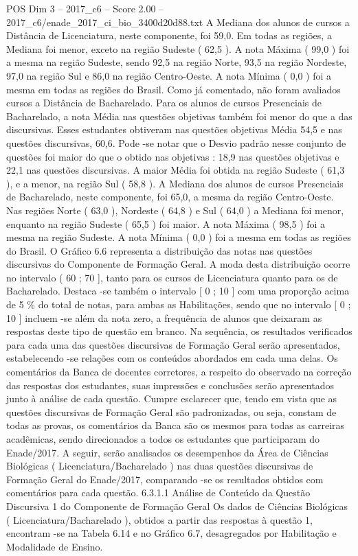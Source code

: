 \begin{textsample}{POS Dim 3 – 2017\_c6 – Score 2.00 – 2017\_c6/enade\_2017\_ci\_bio\_3400d20d88.txt}
A Mediana dos alunos de cursos a Distância de Licenciatura, neste componente, foi 59,0.
Em todas as regiões, a Mediana foi menor, exceto na região Sudeste ( 62,5 ).
A nota Máxima ( 99,0 ) foi a mesma na região Sudeste, sendo 92,5 na região Norte, 93,5 na região Nordeste, 97,0 na região Sul e 86,0 na região Centro-Oeste.
A nota Mínima ( 0,0 ) foi a mesma em todas as regiões do Brasil.
Como já comentado, não foram avaliados cursos a Distância de Bacharelado.
Para os alunos de cursos Presenciais de Bacharelado, a nota Média nas questões objetivas também foi menor do que a das discursivas.
Esses estudantes obtiveram nas questões objetivas Média 54,5 e nas questões discursivas, 60,6.
Pode -se notar que o Desvio padrão nesse conjunto de questões foi maior do que o obtido nas objetivas : 18,9 nas questões objetivas e 22,1 nas questões discursivas.
A maior Média foi obtida na região Sudeste ( 61,3 ), e a menor, na região Sul ( 58,8 ).
A Mediana dos alunos de cursos Presenciais de Bacharelado, neste componente, foi 65,0, a mesma da região Centro-Oeste.
Nas regiões Norte ( 63,0 ), Nordeste ( 64,8 ) e Sul ( 64,0 ) a Mediana foi menor, enquanto na região Sudeste ( 65,5 ) foi maior.
A nota Máxima ( 98,5 ) foi a mesma na região Sudeste.
A nota Mínima ( 0,0 ) foi a mesma em todas as regiões do Brasil.
O Gráfico 6.6 representa a distribuição das notas nas questões discursivas do Componente de Formação Geral.
A moda desta distribuição ocorre no intervalo ( 60 ; 70 ], tanto para os cursos de Licenciatura quanto para os de Bacharelado.
Destaca -se também o intervalo [ 0 ; 10 ] com uma proporção acima de 5 \% do total de notas, para ambas as Habilitações, sendo que no intervalo [ 0 ; 10 ] incluem -se além da nota zero, a frequência de alunos que deixaram as respostas deste tipo de questão em branco.
Na sequência, os resultados verificados para cada uma das questões discursivas de Formação Geral serão apresentados, estabelecendo -se relações com os conteúdos abordados em cada uma delas.
Os comentários da Banca de docentes corretores, a respeito do observado na correção das respostas dos estudantes, suas impressões e conclusões serão apresentados junto à análise de cada questão.
Cumpre esclarecer que, tendo em vista que as questões discursivas de Formação Geral são padronizadas, ou seja, constam de todas as provas, os comentários da Banca são os mesmos para todas as carreiras acadêmicas, sendo direcionados a todos os estudantes que participaram do Enade/2017.
A seguir, serão analisados os desempenhos da Área de Ciências Biológicas ( Licenciatura/Bacharelado ) nas duas questões discursivas de Formação Geral do Enade/2017, comparando -se os resultados obtidos com comentários para cada questão. 6.3.1.1 Análise de Conteúdo da Questão Discursiva 1 do Componente de Formação Geral Os dados de Ciências Biológicas ( Licenciatura/Bacharelado ), obtidos a partir das respostas à questão 1, encontram -se na Tabela 6.14 e no Gráfico 6.7, desagregados por Habilitação e Modalidade de Ensino.

\end{textsample}
